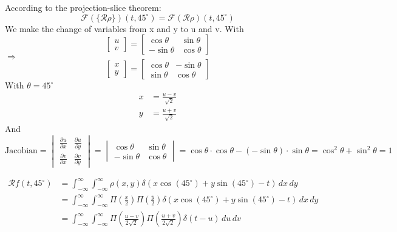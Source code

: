 \documentclass[12pt,twoside]{article}
\begin{document}
\begin{enumerate}
        According to the projection-slice theorem:
        \[
        		\mathcal{F} \left(   \{ \mathcal{R} \rho \} \right) (t,  45^{\circ}) = \mathcal{F} \left( \mathcal{R} \rho  \right) (t, 45^{\circ})
        \]
        We make the change of variables from x and y to u and v.
        With 
        \[
        \begin{bmatrix}
		u \\
		v
	\end{bmatrix}
	=
	\begin{bmatrix}
	\cos\theta & \sin\theta \\
	-\sin\theta & \cos\theta
	\end{bmatrix}
        \]  $\Rightarrow$
        \[
        \begin{bmatrix}
		x \\
		y
	\end{bmatrix}
	=
	\begin{bmatrix}
	\cos\theta & -\sin\theta \\
	\sin\theta & \cos\theta
	\end{bmatrix}
        \] 
        With $\theta=45^{\circ}$
        	 \begin{align*}
	 	x &= \frac{u-v}{\sqrt{2}} \\
	 	y &= \frac{u+v}{\sqrt{2}}
	 \end{align*}
	And
\[
\text{Jacobian} =
\begin{vmatrix}
\frac{\partial u}{\partial x} & \frac{\partial u}{\partial y} \\
\frac{\partial v}{\partial x} & \frac{\partial v}{\partial y}
\end{vmatrix}
=
\begin{vmatrix}
\cos\theta & \sin\theta \\
-\sin\theta & \cos\theta
\end{vmatrix}
= \cos\theta \cdot \cos\theta - (-\sin\theta) \cdot \sin\theta
= \cos^2\theta + \sin^2\theta = 1
\]

\begin{align*}
	\mathcal{R}f(t, 45^{\circ}) &= \int_{-\infty}^{\infty} \int_{-\infty}^{\infty} \rho(x, y) \delta(x \cos(45^\circ) + y \sin(45^\circ) - t) \, dx \, dy \\
	&= \int_{-\infty}^{\infty} \int_{-\infty}^{\infty} \Pi\left(\frac{x}{2}\right) \Pi\left(\frac{y}{2}\right) \delta\left(x \cos(45^\circ) + y \sin(45^\circ) - t\right) \, dx \, dy \\
	&= \int_{-\infty}^{\infty} \int_{-\infty}^{\infty} \Pi\left(\frac{u-v}{2 \sqrt{2}}\right) \Pi\left(\frac{u+v}{2 \sqrt{2}}\right) \delta\left(t - u\right) \, du \, dv
\end{align*}


\end{enumerate}
\end{document}
